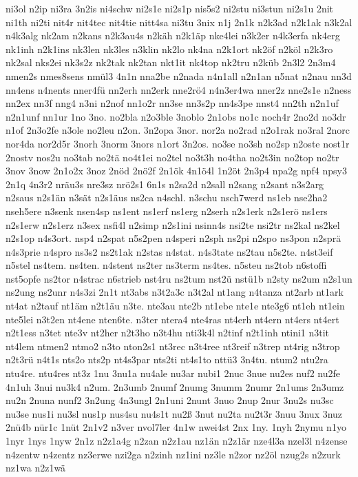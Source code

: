 {ni3ol
n2ip
ni3ra
3n2is
ni4schw
ni2s1e
ni2s1p
nis5s2
ni2stu
ni3stun
ni2s1u
2nit
ni1th
ni2ti
nit4r
nit4tec
nit4tie
nitt4sa
ni3tu
3nix
n1j
2n1k
n2k3ad
n2k1ak
n3k2al
n4k3alg
nk2am
n2kans
n2k3au4s
n2käh
n2k1äp
nke4lei
n3k2er
n4k3erfa
nk4erg
nk1inh
n2k1ins
nk3len
nk3les
n3klin
nk2lo
nk4na
n2k1ort
nk2öf
n2köl
n2k3ro
nk2sal
nks2ei
nk3s2z
nk2tak
nk2tan
nkt1it
nk4top
nk2tru
n2küb
2n3l2
2n3m4
nmen2s
nmes8sens
nmül3
4n1n
nna2be
n2nada
n4n1all
n2n1an
n5nat
n2nau
nn3d
nn4ens
n4nents
nner4fü
nn2erh
nn2erk
nne2rö4
n4n3er4wa
nner2z
nne2s1e
n2ness
nn2ex
nn3f
nng4
n3ni
n2nof
nn1o2r
nn3se
nn3s2p
nn4s3pe
nnst4
nn2th
n2n1uf
n2n1unf
nn1ur
1no
3no.
no2bla
n2o3ble
3noblo
2n1obs
no1c
noch4r
2no2d
no3dr
n1of
2n3o2fe
n3ole
no2leu
n2on.
3n2opa
3nor.
nor2a
no2rad
n2o1rak
no3ral
2norc
nor4da
nor2d5r
3norh
3norm
3nors
n1ort
3n2os.
no3se
no3sh
no2sp
n2oste
nost1r
2nostv
nos2u
no3tab
no2tä
no4t1ei
no2tel
no3t3h
no4tha
no2t3in
no2top
no2tr
3nov
3now
2n1o2x
3noz
2nöd
2nö2f
2n1ök
4n1ö4l
1n2öt
2n3p4
npa2g
npf4
npsy3
2n1q
4n3r2
nräu3s
nre3sz
nrö2s1
6n1s
n2sa2d
n2sall
n2sang
n2sant
n3s2arg
n2saus
n2s1än
n3sät
n2s1äus
ns2ca
n4schl.
n3schu
nsch7werd
ns1eb
nse2ha2
nseh5ere
n3senk
nsen4sp
ns1ent
ns1erf
ns1erg
n2serh
n2s1erk
n2s1erö
ns1ers
n2s1erw
n2s1erz
n3sex
nsfi4l
n2simp
n2s1ini
nsinn4s
nsi2te
nsi2tr
ns2kal
ns2kel
n2s1op
n4s3ort.
nsp4
n2spat
n5s2pen
n4speri
n2sph
ns2pi
n2spo
ns3pon
n2sprä
n4s3prie
n4spro
ns3s2
ns2t1ak
n2stas
n4stat.
n4s3tate
ns2tau
n5s2te.
n4st3eif
n5stel
ns4tem.
ns4ten.
n4stent
ns2ter
ns3term
ns4tes.
n5steu
ns2tob
n6stoffi
nst5opfe
ns2tor
n4strac
n6strieb
nst4ru
ns2tum
nst2ü
nstü1b
n2sty
ns2um
n2s1un
ns2ung
ns2unr
n4s3zi
2n1t
nt3abs
n3t2a3c
n3t2al
nt1ang
n4tanza
nt2arb
nt1ark
nt4at
n2tauf
nt1äm
n2t1äu
n3te.
nte3au
nte2b
nt1ebe
nte1e
nte3g6
nt1eh
nt1ein
nte5lei
n3t2en
nt4ene
nten6te.
n3ter
ntera4
nte4ras
nt4erh
nt4ern
nt4ers
nt4ert
n2t1ess
n3tet
nte3v
nt2her
n2t3ho
n3t4hu
nti3k4l
n2tinf
n2t1inh
ntini1
n3tit
nt4lem
ntmen2
ntmo2
n3to
nton2s1
nt3rec
n3t4ree
nt3reif
n3trep
nt4rig
n3trop
n2t3rü
n4t1s
nts2o
nts2p
nt4s3par
nts2ti
nt4s1to
nttü3
3n4tu.
ntum2
ntu2ra
ntu4re.
ntu4res
nt3z
1nu
3nu1a
nu4ale
nu3ar
nubi1
2nuc
3nue
nu2es
nuf2
nu2fe
4n1uh
3nui
nu3k4
n2um.
2n3umb
2numf
2numg
3numm
2numr
2n1ums
2n3umz
nu2n
2nuna
nunf2
3n2ung
4n3ungl
2n1uni
2nunt
3nuo
2nup
2nur
3nu2s
nu3sc
nu3se
nus1i
nu3sl
nus1p
nus4su
nu4s1t
nu2ß
3nut
nu2ta
nu2t3r
3nuu
3nux
3nuz
2nü4b
nür1c
1nüt
2n1v2
n3ver
nvol7ler
4n1w
nwei4st
2nx
1ny.
1nyh
2nymu
n1yo
1nyr
1nys
1nyw
2n1z
n2z1a4g
n2zan
n2z1au
nz1än
n2z1är
nze4l3a
nzel3l
n4zense
n4zentw
n4zentz
nz3erwe
nzi2ga
n2zinh
nz1ini
nz3le
n2zor
nz2öl
nzug2s
n2zurk
nz1wa
n2z1wä
}
